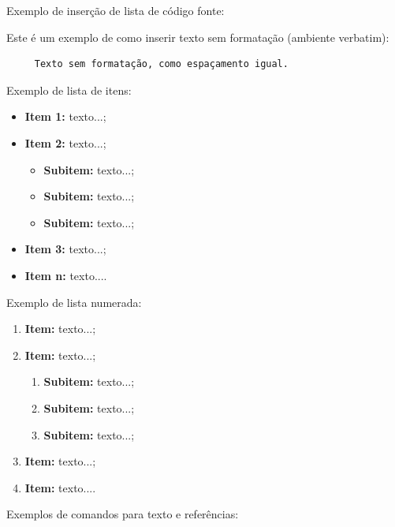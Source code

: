 \documentclass[
	article,
	11pt,
	oneside,
	a4paper,
	chapter=TITLE,
	section=TITLE,
	english,
	brazil,
	sumario=tradicional
]{abntex2}
\begin{document}
     
     Exemplo de inserção de lista de código fonte:
     
      
     
     
     
     Este é um exemplo de como inserir texto sem formatação (ambiente verbatim):
     
     \begin{verbatim}
     Texto sem formatação, como espaçamento igual.
     \end{verbatim}
     
     
     Exemplo de lista de itens:
     
     \begin{itemize}
     	\item \textbf{Item 1:} texto...;
     	\item \textbf{Item 2:} texto...;
     	\begin{itemize}
     		\item \textbf{Subitem:} texto...;
     		\item \textbf{Subitem:} texto...;
     		\item \textbf{Subitem:} texto...;
     	\end{itemize}
     	\item \textbf{Item 3:} texto...;
     	\item \textbf{Item n:} texto....
     \end{itemize}
     
     
     Exemplo de lista numerada:
     
     \begin{enumerate}
     	\item \textbf{Item:} texto...;
     	\item \textbf{Item:} texto...;
     	\begin{enumerate}
     		\item \textbf{Subitem:} texto...;
     		\item \textbf{Subitem:} texto...;
     		\item \textbf{Subitem:} texto...;
     	\end{enumerate}
     	\item \textbf{Item:} texto...;
     	\item \textbf{Item:} texto....
     \end{enumerate}
     
     
     Exemplos de comandos para texto e referências:
     
\end{document}

